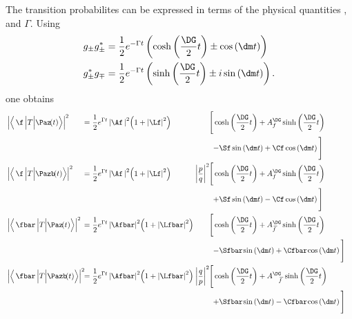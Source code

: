 The transition probabilites can be expressed in terms of the physical quantities \dm, \DG and $\Gamma$.
Using
\begin{align}
g_{\pm}g_{\pm}^{*} &= \frac{1}{2}e^{-\Gamma t}\left(\cosh\left(\frac{\DG}{2}t\right)\pm\cos\left(\dm t\right)\right)\\
g_{\pm}^*g_{\mp} &=  \frac{1}{2}e^{-\Gamma t}\left(\sinh\left(\frac{\DG}{2}t\right)\pm i\sin\left(\dm t\right)\right).
\end{align}
one obtains
\begin{align}
&\left|\left<\,\f\,\Big|T\Big|\Paz\!(t)\right>\right|^2\!\!&\kern -7.5pt{=}
&\kern 3pt {\frac{1}{2}e^{\Gamma t}\left|\Af\,\right|^2\!\left(1+\left|\Lf\right|^2\right)}& &&
&\kern -10.5pt{\Bigg[\cosh\left(\frac{\DG}{2}t\right) + A_f^{\DG}\sinh\left(\frac{\DG}{2}t\right)}&\nonumber\\
&& && && &\kern -5pt{-\Sf\sin\left(\dm t\right)+\Cf\cos\left(\dm t\right)\Bigg]}&\label{eq:Ptof}\\
&\left|\left<\,\f\,\Big|T\Big|\Pazb\!(t)\right>\right|^2\!\!&\kern -7.5pt{=}
&\kern 3pt {\frac{1}{2}e^{\Gamma t}\left|\Af\,\right|^2\!\left(1+\left|\Lf\right|^2\right)}& &\kern -7.5pt{\left|\frac{p}{q}\right|^2}&
&\kern -10.5pt{\Bigg[\cosh\left(\frac{\DG}{2}t\right) + A_f^{\DG}\sinh\left(\frac{\DG}{2}t\right)}&\nonumber\\
&& && && &\kern -5pt{+\Sf\sin\left(\dm t\right)-\Cf\cos\left(\dm t\right)\Bigg]}&\label{eq:Pbartof}\\
&\left|\left<\,\fbar\,\Big|T\Big|\Paz\!(t)\right>\right|^2\!\!&\kern -7.5pt{=}
&\kern 3pt {\frac{1}{2}e^{\Gamma t}\left|\Afbar\right|^2\!\left(1+\left|\Lfbar\right|^2\right)}& &&
&\kern -10.5pt{\Bigg[\cosh\left(\frac{\DG}{2}t\right) + A_{\kern 1.5pt\overline{\kern -1.5pt f\kern 1.5pt}}^{\DG}\sinh\left(\frac{\DG}{2}t\right)}&\nonumber\\
&& && && &\kern -5pt{-\Sfbar\kern -0.1em\sin\left(\dm t\right)+\Cfbar\kern -0.1em\cos\left(\dm t\right)\Bigg]}&\label{eq:Ptofbar}\\
&\left|\left<\,\fbar\,\Big|T\Big|\Pazb\!(t)\right>\right|^2\!\!&\kern -7.5pt{=}
&\kern 3pt {\frac{1}{2}e^{\Gamma t}\left|\Afbar\right|^2\!\left(1+\left|\Lfbar\right|^2\right)}& &\kern -7.5pt{\left|\frac{q}{p}\right|^2}&
&\kern -10.5pt{\Bigg[\cosh\left(\frac{\DG}{2}t\right) + A_{\kern 9.5pt\overline{\kern -1.5pt f\kern 1.5pt}}^{\DG}\sinh\left(\frac{\DG}{2}t\right)}&\nonumber\\
&& && && &\kern -5pt{+\Sfbar\kern -0.1em \sin\left(\dm t\right)-\Cfbar\kern -0.1em\cos\left(\dm t\right)\Bigg]}&\label{eq:Pbartofbar}
\end{align}
